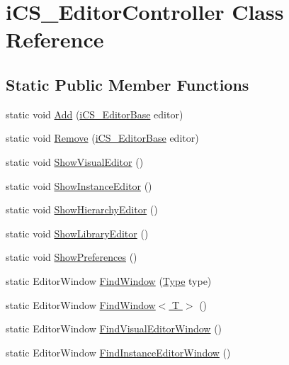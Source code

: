 \hypertarget{classi_c_s___editor_controller}{\section{i\+C\+S\+\_\+\+Editor\+Controller Class Reference}
\label{classi_c_s___editor_controller}
}
\subsection*{Static Public Member Functions}
\begin{DoxyCompactItemize}
\item 
static void \hyperlink{classi_c_s___editor_controller_a1a16f5ae3deb6d62be321fe428bff9a8}{Add} (\hyperlink{classi_c_s___editor_base}{i\+C\+S\+\_\+\+Editor\+Base} editor)
\item 
static void \hyperlink{classi_c_s___editor_controller_a5d9bc1f218e9ca268929952911344203}{Remove} (\hyperlink{classi_c_s___editor_base}{i\+C\+S\+\_\+\+Editor\+Base} editor)
\item 
static void \hyperlink{classi_c_s___editor_controller_ae5813ea96854ba0e7ca766fcd97a8d63}{Show\+Visual\+Editor} ()
\item 
static void \hyperlink{classi_c_s___editor_controller_a486f68bac586509c6afe1c2ff5334a97}{Show\+Instance\+Editor} ()
\item 
static void \hyperlink{classi_c_s___editor_controller_a178b5e8612effbff56544e5c39ab7390}{Show\+Hierarchy\+Editor} ()
\item 
static void \hyperlink{classi_c_s___editor_controller_ad6840324d5ee908a2539fc11d02320ac}{Show\+Library\+Editor} ()
\item 
static void \hyperlink{classi_c_s___editor_controller_a3705cfc307f7c86ec27e0704d2aaa017}{Show\+Preferences} ()
\item 
static Editor\+Window \hyperlink{classi_c_s___editor_controller_a1277a712c13181e29dfb1578ddad91c7}{Find\+Window} (\hyperlink{i_c_s___object_type_enum_8cs_ae6c3dd6d8597380b56d94908eb431547aa1fa27779242b4902f7ae3bdd5c6d508}{Type} type)
\item 
static Editor\+Window \hyperlink{classi_c_s___editor_controller_a7373a3d341b9b9e7187fe5f71dc20a8b}{Find\+Window$<$ T $>$} ()
\item 
static Editor\+Window \hyperlink{classi_c_s___editor_controller_a7e62e113a3402e540bcad6002436504a}{Find\+Visual\+Editor\+Window} ()
\item 
static Editor\+Window \hyperlink{classi_c_s___editor_controller_a6d44c3bf685a62702a60dea1ab90ff8d}{Find\+Instance\+Editor\+Window} ()

\end{DoxyCompactItemize}

